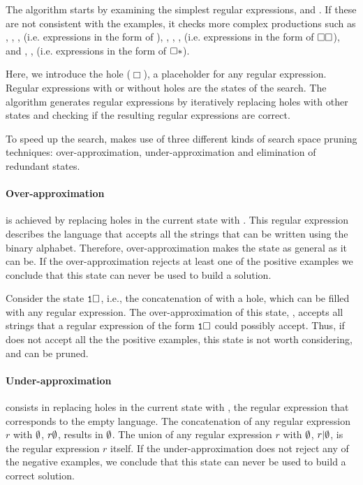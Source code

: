 The algorithm starts by examining the simplest regular expressions,  and .
If these are not consistent with the examples, it checks more complex productions such as , , ,  (i.e. expressions in the form of \regex{\Box|\Box}), , , ,  (i.e. expressions in the form of \(\tt\Box\Box\)), and , , (i.e. expressions in the form of \(\tt\Box*\)).

Here, we introduce the hole (\(\Box\)), a placeholder for any regular expression. Regular expressions with or without holes are the states of the search.
The algorithm generates regular expressions by iteratively replacing holes with other states and checking if the resulting regular expressions are correct.

To speed up the search, \AlphaRegex makes use of three different kinds of search space pruning techniques: over-approximation, under-approximation and elimination of redundant states.

\paragraph{Over-approximation} is achieved by replacing holes in the current state with .
This regular expression describes the language that accepts all the strings that can be written using the binary alphabet.
Therefore, over-approximation makes the state as general as it can be.
If the over-approximation rejects at least one of the positive examples we conclude that this state can never be used to build a solution.

\begin{example}
Consider the state \(\tt1\Box\), i.e., the concatenation of  with a hole, which can be filled with any regular expression. The over-approximation of this state, , accepts all strings that a regular expression of the form \(\tt1\Box\) could possibly accept. Thus, if  does not accept all the the positive examples, this state is not worth considering, and can be pruned.
\end{example}

\paragraph{Under-approximation} consists in replacing holes in the current state with \regex{\emptyset}, the regular expression that corresponds to the empty language. The concatenation of any regular expression \(r\) with \(\tt\emptyset\), \(r\tt\emptyset\), results in \(\tt\emptyset\). The union of any  regular expression \(r\) with \(\tt\emptyset\), \(r|\tt\emptyset\), is the regular expression \(r\) itself.
If the under-approximation does not reject any of the negative examples,  we conclude that this state can never be used to build a correct solution.

